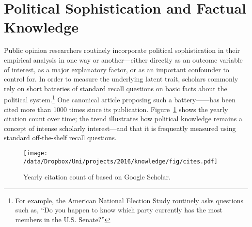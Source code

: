 \section*{Political Sophistication and Factual Knowledge}


Public opinion researchers routinely incorporate political sophistication in their empirical analysis in one way or another---either directly as an outcome variable of interest, as a major explanatory factor, or as an important confounder to control for. In order to measure the underlying latent trait, scholars commonly rely on short batteries of standard recall questions on basic facts about the political system.\footnote{For example, the American National Election Study routinely asks questions such as, ``Do you happen to know which party currently has the most members in the U.S. Senate?''} One canonical article proposing such a battery---\citet{carpini1993measuring}---has been cited more than 1000 times since its publication. Figure~\ref{fig:carpini} shows the yearly citation count over time; the trend illustrates how political knowledge remains a concept of intense scholarly interest---and that it is frequently measured using standard off-the-shelf recall questions.

\begin{figure}[h]\centering
	\texttt{[image: /data/Dropbox/Uni/projects/2016/knowledge/fig/cites.pdf]}
	\caption[Yearly citation count of \citet{carpini1993measuring}]{Yearly citation count of \citet{carpini1993measuring} based on Google Scholar.}\label{fig:carpini}
\end{figure}

